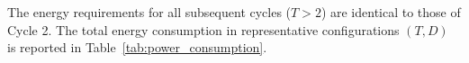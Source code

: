 The energy requirements for all subsequent cycles ($T>2$) are identical to those of Cycle 2. The total energy consumption in representative configurations $(T, D)$ is reported in Table~\ref{tab:power_consumption}.

